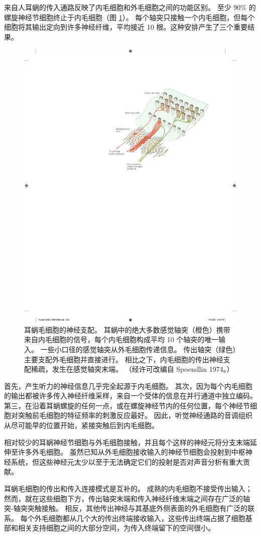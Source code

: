 来自人耳蜗的传入通路反映了内毛细胞和外毛细胞之间的功能区别。 
至少 90\% 的螺旋神经节细胞终止于内毛细胞（图 \ref{fig:26_17}）。 
每个轴突只接触一个内毛细胞，但每个细胞将其输出定向到许多神经纤维，平均接近 10 根。这种安排产生了三个重要结果。

\begin{figure}[htbp]
	\centering
	\includegraphics[width=0.65\linewidth]{chap26/fig_26_17}
	\caption{耳蜗毛细胞的神经支配。 耳蜗中的绝大多数感觉轴突（橙色）携带来自内毛细胞的信号，每个内毛细胞构成平均 10 个轴突的唯一输入。 一些小口径的感觉轴突从外毛细胞传递信息。 传出轴突（绿色）主要支配外毛细胞并直接进行。 相比之下，内毛细胞的传出神经支配稀疏，发生在感觉轴突末端。 （经许可改编自 Spoendlin 1974。）}
	\label{fig:26_17}
\end{figure}

首先，产生听力的神经信息几乎完全起源于内毛细胞。 其次，因为每个内毛细胞的输出都被许多传入神经纤维采样，来自一个受体的信息在并行通道中独立编码。 第三，在沿着耳蜗螺旋的任何一点，或在螺旋神经节内的任何位置，每个神经节细胞对突触前毛细胞的特征频率的刺激反应最好。 因此，听觉神经通路的音调组织从尽可能早的位置开始，紧接突触后到内毛细胞。

相对较少的耳蜗神经节细胞与外毛细胞接触，并且每个这样的神经元将分支末端延伸至许多外毛细胞。 虽然已知从外毛细胞接收输入的神经节细胞会投射到中枢神经系统，但这些神经元太少以至于无法确定它们的投射是否对声音分析有重大贡献。

耳蜗毛细胞的传出和传入连接模式是互补的。 成熟的内毛细胞不接受传出输入； 然而，就在这些细胞下方，传出轴突末端和传入神经纤维末端之间存在广泛的轴突-轴突突触接触。 相反，其他传出神经与其基底外侧表面的外毛细胞有广泛的联系。 每个外毛细胞都从几个大的传出终端接收输入，这些传出终端占据了细胞基部和相关支持细胞之间的大部分空间，为传入终端留下的空间很小。



